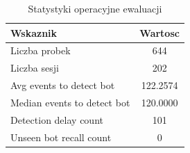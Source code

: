 \begin{table}[H]
  \centering
  \begin{tabular}{l c}
    \toprule
    Wskaznik & Wartosc \\
    \midrule
    Liczba probek & 644 \\
    Liczba sesji & 202 \\
    Avg events to detect bot & 122.2574 \\
    Median events to detect bot & 120.0000 \\
    Detection delay count & 101 \\
    Unseen bot recall count & 0 \\
    \bottomrule
  \end{tabular}
  \caption{Statystyki operacyjne ewaluacji}
  \label{tab:eval-operational}
\end{table}
